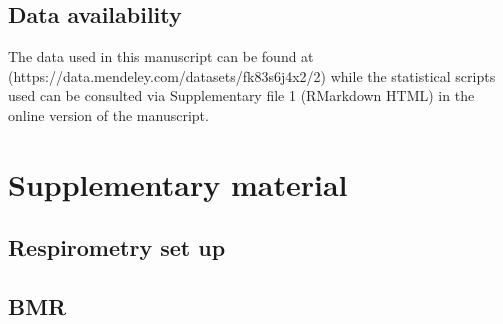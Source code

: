 \documentclass[10pt, twoside]{book} %
\begin{document}
\subsection*{Data availability}
The data used in this manuscript can be found at\newline
(https://data.mendeley.com/datasets/fk83s6j4x2/2) while the statistical scripts used can be consulted via Supplementary file 1 (RMarkdown HTML) in the online version of the manuscript. 

\section{Supplementary material}

\subsection*{Respirometry set up}

\subsection*{BMR}
\end{document}
